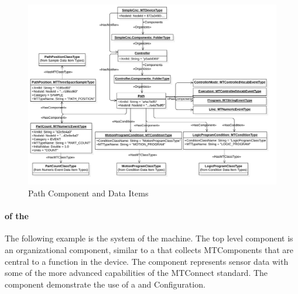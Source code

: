 \begin{figure}[ht]
  \centering
  \includegraphics[width=1.0\textwidth]{diagrams/mtconnect-mapping/path-component.png}
  \caption{Path Component and Data Items}
  \label{fig:path-component}
\end{figure}

\FloatBarrier

\paragraph{  of the }

The following example is the  system of the machine. The top level  component is an organizational component, similar to a  that collects \glspl{MTComponent} that are central to a function in the device. The  component represents sensor data with some of the more advanced capabilities of the MTConnect standard. The  component demonstrate the use of a  and \gls{Configuration}.

